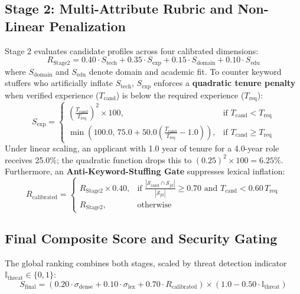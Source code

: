 \documentclass[12pt,a4paper]{article}
\begin{document}
\subsection{Stage 2: Multi-Attribute Rubric and Non-Linear Penalization}
Stage 2 evaluates candidate profiles across four calibrated dimensions:
{\small
\begin{equation}
    R_{\text{Stage2}} = 0.40 \cdot S_{\text{tech}} + 0.35 \cdot S_{\text{exp}} + 0.15 \cdot S_{\text{domain}} + 0.10 \cdot S_{\text{edu}}
\end{equation}
}
where $S_{\text{domain}}$ and $S_{\text{edu}}$ denote domain and academic fit. To counter keyword stuffers who artificially inflate $S_{\text{tech}}$, $S_{\text{exp}}$ enforces a \textbf{quadratic tenure penalty} when verified experience ($T_{\text{cand}}$) is below the required experience ($T_{\text{req}}$):
{\small
\begin{equation}
    S_{\text{exp}} = \begin{cases} 
        \left(\frac{T_{\text{cand}}}{T_{\text{req}}}\right)^2 \times 100, & \text{if } T_{\text{cand}} < T_{\text{req}} \\
        \min\left(100.0, \, 75.0 + 50.0 \left(\frac{T_{\text{cand}}}{T_{\text{req}}} - 1.0\right)\right), & \text{if } T_{\text{cand}} \ge T_{\text{req}}
    \end{cases}
\end{equation}
}
Under linear scaling, an applicant with 1.0 year of tenure for a 4.0-year role receives 25.0\%; the quadratic function drops this to $(0.25)^2 \times 100 = 6.25\%$. Furthermore, an \textbf{Anti-Keyword-Stuffing Gate} suppresses lexical inflation:
{\small
\begin{equation}
    R_{\text{calibrated}} = \begin{cases} 
        R_{\text{Stage2}} \times 0.40, & \text{if } \frac{|\mathcal{S}_{\text{cand}} \cap \mathcal{S}_{\text{jd}}|}{|\mathcal{S}_{\text{jd}}|} \ge 0.70 \text{ and } T_{\text{cand}} < 0.60\, T_{\text{req}} \\
        R_{\text{Stage2}}, & \text{otherwise}
    \end{cases}
\end{equation}
}

\subsection{Final Composite Score and Security Gating}
The global ranking combines both stages, scaled by threat detection indicator $\mathbb{I}_{\text{threat}} \in \{0, 1\}$:
{\small
\begin{equation}
    S_{\text{final}} = \left( 0.20 \cdot \sigma_{\text{dense}} + 0.10 \cdot \sigma_{\text{lex}} + 0.70 \cdot R_{\text{calibrated}} \right) \times (1.0 - 0.50 \cdot \mathbb{I}_{\text{threat}})
\end{equation}
}
\end{document}
